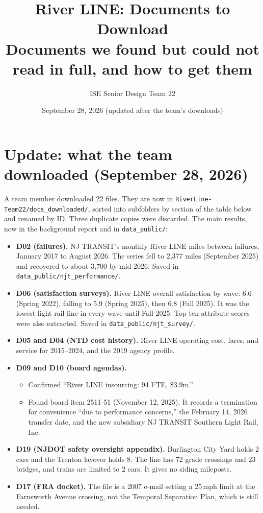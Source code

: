 \documentclass[10.5pt]{article}
\title{River LINE: Documents to Download\\\large Documents we found but could not read in full, and how to get them}
\author{ISE Senior Design Team 22}
\date{September 28, 2026 (updated after the team's downloads)}
\begin{document}
\maketitle


\section*{Update: what the team downloaded (September 28, 2026)}
A team member downloaded 22 files. They are now in \texttt{RiverLine-Team22/docs\_downloaded/}, sorted into subfolders by section of the table below and renamed by ID. Three duplicate copies were discarded. The main results, now in the background report and in \texttt{data\_public/}:

\begin{itemize}
\item \textbf{D02 (failures).} NJ TRANSIT's monthly River LINE miles between failures, January 2017 to August 2026. The series fell to 2{,}377 miles (September 2025) and recovered to about 3{,}700 by mid-2026. Saved in \texttt{data\_public/njt\_performance/}.
\item \textbf{D06 (satisfaction surveys).} River LINE overall satisfaction by wave: 6.6 (Spring 2022), falling to 5.9 (Spring 2025), then 6.8 (Fall 2025). It was the lowest light rail line in every wave until Fall 2025. Top-ten attribute scores were also extracted. Saved in \texttt{data\_public/njt\_survey/}.
\item \textbf{D05 and D04 (NTD cost history).} River LINE operating cost, fares, and service for 2015--2024, and the 2019 agency profile.
\item \textbf{D09 and D10 (board agendas).}
  \begin{itemize}
  \item Confirmed ``River LINE insourcing: 94 FTE, \$3.9m.''
  \item Found board item 2511-51 (November 12, 2025). It records a termination for convenience ``due to performance concerns,'' the February 14, 2026 transfer date, and the new subsidiary NJ TRANSIT Southern Light Rail, Inc.
  \end{itemize}
\item \textbf{D19 (NJDOT safety oversight appendix).} Burlington City Yard holds 2 cars and the Trenton layover holds 8. The line has 72 grade crossings and 23 bridges, and trains are limited to 2 cars. It gives no siding mileposts.
\item \textbf{D17 (FRA docket).} The file is a 2007 e-mail setting a 25\,mph limit at the Farnsworth Avenue crossing, not the Temporal Separation Plan, which is still needed.
\end{itemize}
\end{document}
